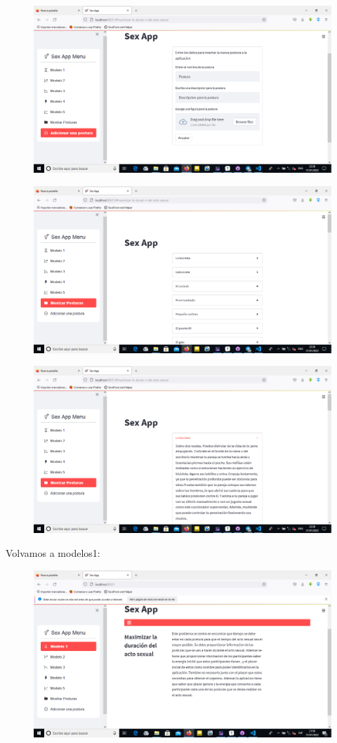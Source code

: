 \documentclass{llncs}
\begin{document}
\begin{figure}
	\centering
	\includegraphics[width=0.7\linewidth]{Imagenes/aplicacion/web2}
	\label{fig:web2}
\end{figure}
\begin{figure}
	\centering
	\includegraphics[width=0.7\linewidth]{Imagenes/aplicacion/web3}
	\label{fig:web3}
\end{figure}
\begin{figure}
	\centering
	\includegraphics[width=0.7\linewidth]{Imagenes/aplicacion/web4}
	\label{fig:web4}
\end{figure}

Volvamos a modelos1:
\begin{figure}
	\centering
	\includegraphics[width=0.7\linewidth]{Imagenes/aplicacion/web1}
	\label{fig:web1.1}
\end{figure}
\end{document}
